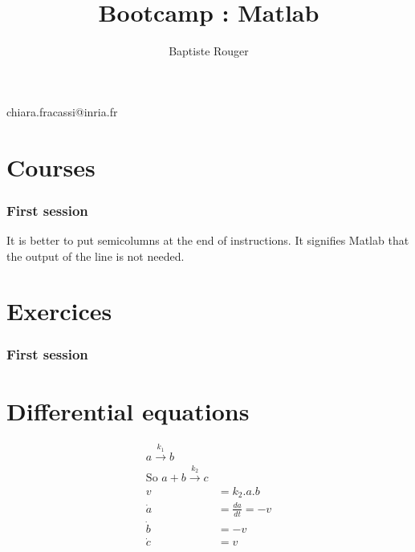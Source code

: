 \documentclass[10pt,a4paper]{article}
\author{Baptiste Rouger}
\title{Bootcamp : Matlab}
\begin{document}
\maketitle

\begin{flushright}
chiara.fracassi@inria.fr
\end{flushright}

\tableofcontents

\newpage

\part{Courses}
\section{First session}

It is better to put semicolumns at the end of instructions. It signifies Matlab that the output of the line is not needed.




\part{Exercices}
\section{First session}









\part{Differential equations}

\begin{align*}
a \xrightarrow{k_1} b \\
\text{So } a + b \xrightarrow{k_2} c\\
v &= k_2.a.b\\
\dot{a} &= \frac{da}{dt} = -v\\
\dot{b} &= -v\\
\dot{c} &= v
\end{align*}
\end{document}
